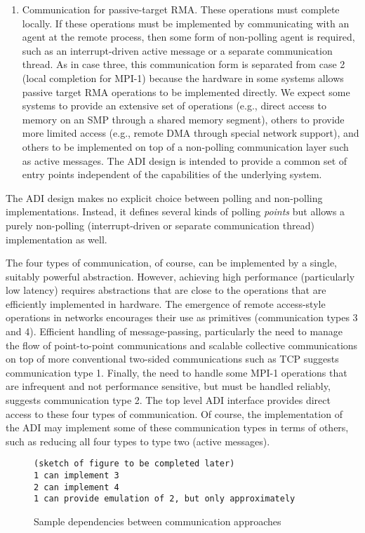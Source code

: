 \begin{enumerate}
\item Communication for passive-target RMA.  These operations
must complete locally.  If these operations must be implemented by
communicating with an agent at the remote process, then some form of
non-polling agent is required, such as an interrupt-driven active
message or a separate communication thread.  As in case three, this
communication form is separated from case 2 (local completion for
MPI-1) because the hardware in some systems allows passive target RMA
operations to be implemented directly.  We expect some systems to
provide an extensive set of operations (e.g., direct access to memory
on an SMP through a shared memory segment), others to provide more
limited access (e.g., remote DMA through special network support), and
others to be implemented on top of a non-polling communication layer
such as active messages.  The ADI design is intended to provide a
common set of entry points independent of the capabilities of the
underlying system.

\end{enumerate}

The ADI design makes no explicit choice between polling and
non-polling implementations.  Instead, it defines several kinds of
polling \emph{points} but allows a purely non-polling
(interrupt-driven or separate communication thread) implementation as well.

The four types of communication, of course, can be implemented by a
single, suitably powerful abstraction.  However, achieving high
performance (particularly low latency) requires abstractions that are
close to the operations that are efficiently implemented in hardware.
The emergence of remote access-style operations in networks
\cite{unet,via,infiniband} encourages their use as primitives
(communication types 3 and 4).  Efficient handling of message-passing,
particularly the need to manage the flow of point-to-point
communications and scalable collective communications on top of more
conventional two-sided communications such as TCP suggests
communication type 1.  Finally, the need to handle some MPI-1
operations that are infrequent and not performance sensitive, but must
be handled reliably, suggests communication type 2.  The top level ADI
interface provides direct access to these four types of communication.  Of
course, the implementation of the ADI may implement some of these
communication types in terms of others, such as reducing all four types to
type two (active messages).  

\begin{figure}
\begin{verbatim}
(sketch of figure to be completed later)
1 can implement 3
2 can implement 4
1 can provide emulation of 2, but only approximately
\end{verbatim}
\caption{Sample dependencies between communication approaches}
\label{fig:comm-depend}
\end{figure}

